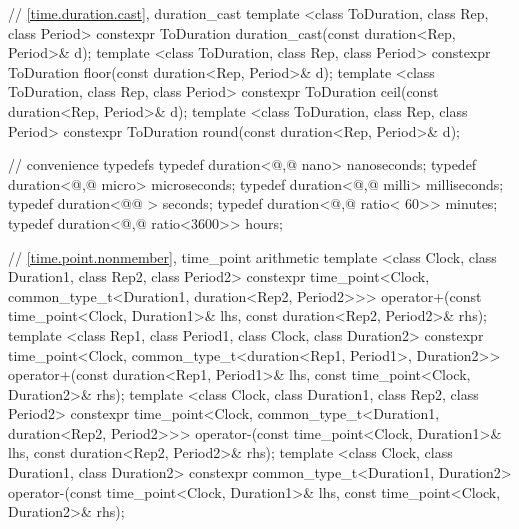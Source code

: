 \begin{codeblock}
{{// \ref{time.duration.cast}, duration_cast
template <class ToDuration, class Rep, class Period>
  constexpr ToDuration duration_cast(const duration<Rep, Period>& d);
template <class ToDuration, class Rep, class Period>
  constexpr ToDuration floor(const duration<Rep, Period>& d);
template <class ToDuration, class Rep, class Period>
  constexpr ToDuration ceil(const duration<Rep, Period>& d);
template <class ToDuration, class Rep, class Period>
  constexpr ToDuration round(const duration<Rep, Period>& d);

// convenience typedefs
typedef duration<@,@        nano> nanoseconds;
typedef duration<@,@       micro> microseconds;
typedef duration<@,@       milli> milliseconds;
typedef duration<@@             > seconds;
typedef duration<@,@ ratio<  60>> minutes;
typedef duration<@,@ ratio<3600>> hours;

// \ref{time.point.nonmember}, time_point arithmetic
template <class Clock, class Duration1, class Rep2, class Period2>
  constexpr time_point<Clock, common_type_t<Duration1, duration<Rep2, Period2>>>
  operator+(const time_point<Clock, Duration1>& lhs, const duration<Rep2, Period2>& rhs);
template <class Rep1, class Period1, class Clock, class Duration2>
  constexpr time_point<Clock, common_type_t<duration<Rep1, Period1>, Duration2>>
  operator+(const duration<Rep1, Period1>& lhs, const time_point<Clock, Duration2>& rhs);
template <class Clock, class Duration1, class Rep2, class Period2>
  constexpr time_point<Clock, common_type_t<Duration1, duration<Rep2, Period2>>>
  operator-(const time_point<Clock, Duration1>& lhs, const duration<Rep2, Period2>& rhs);
template <class Clock, class Duration1, class Duration2>
  constexpr common_type_t<Duration1, Duration2>
  operator-(const time_point<Clock, Duration1>& lhs, const time_point<Clock, Duration2>& rhs);

}}
\end{codeblock}
